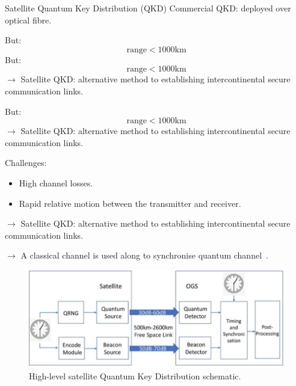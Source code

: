 \begin{frame}{Satellite Quantum Key Distribution (QKD)}
    Commercial QKD: deployed over optical fibre.
    \begin{overprint}
        But: $$\mathrm{range}< 1000 \mathrm{km}$$
        But: $$\mathrm{range}< 1000 \mathrm{km}$$
        $\rightarrow$ Satellite QKD: alternative method to establishing intercontinental secure communication links.
        
        But: $$\mathrm{range}< 1000 \mathrm{km}$$
        $\rightarrow$ Satellite QKD: alternative method to establishing intercontinental secure communication links.
        
        Challenges:
        \begin{itemize}
            \item High channel losses.
            \item Rapid relative motion between the transmitter and receiver.
        \end{itemize}
        $\rightarrow$ Satellite QKD: alternative method to establishing intercontinental secure communication links.
        
        $\rightarrow$ A classical channel is used along to synchronise quantum channel~.
        \begin{figure}
            \centering
            \includegraphics[scale=.3]{Images/Motivation/SatteliteQKD.png}
            \caption{High-level satellite Quantum Key Distribution schematic.}
            \label{fig:satelliteQKD}
        \end{figure}
    \end{overprint}
    
\end{frame}


